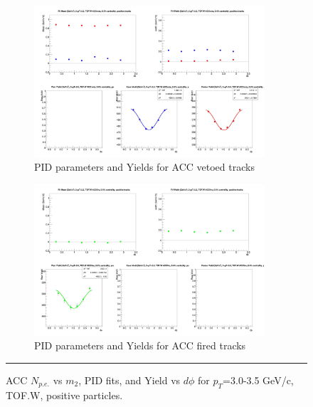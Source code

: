 \begin{figure}[H]
  \ContinuedFloat
    \vspace*{-1cm}
    \begin{subfigure}{1\textwidth}
   \centering
   \includegraphics[width=0.94\textwidth]{hiptfits/pos/fitParams_tof2_cent0_ch1_pT-30-35.jpg}
    \caption{PID parameters and Yields for ACC vetoed tracks}
    \end{subfigure}    
    \begin{subfigure}{1\textwidth}
   \centering
   \includegraphics[width=0.94\textwidth]{hiptfits/pos/fitParams_tof3_cent0_ch1_pT-30-35.jpg}
    \caption{PID parameters and Yields for ACC fired tracks}
    \end{subfigure} 
    \rule{35em}{0.5pt}
  \caption[ACC $N_{p.e.}$ vs $m_2$, PID fits, and Yield vs $d\phi$ for $p_T$=3.0-3.5 GeV/c, TOF.W, positive particles.]{ACC $N_{p.e.}$ vs $m_2$, PID fits, and Yield vs $d\phi$ for $p_T$=3.0-3.5 GeV/c, TOF.W, positive particles.}
  \label{fig:acc30-35pos}
\end{figure}

